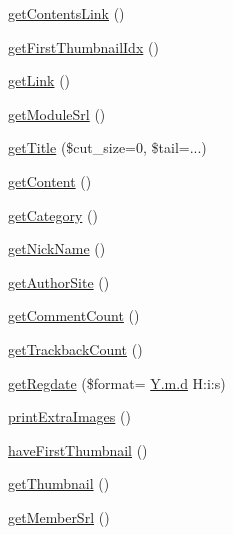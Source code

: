 \begin{DoxyCompactItemize}
\item 
\hyperlink{classmcontentItem_a60fe1f5cbd47314c2910a8782a3252a9}{get\+Contents\+Link} ()
\item 
\hyperlink{classmcontentItem_acb7e5ab4fbeac716585618eba64960aa}{get\+First\+Thumbnail\+Idx} ()
\item 
\hyperlink{classmcontentItem_a5a2cad58644aabb016942e427998f32c}{get\+Link} ()
\item 
\hyperlink{classmcontentItem_a9b9841e39ff3ee331679270f9e075203}{get\+Module\+Srl} ()
\item 
\hyperlink{classmcontentItem_a180633138fb77537e7da900074aa7454}{get\+Title} (\$cut\+\_\+size=0, \$tail=\textquotesingle{}...\textquotesingle{})
\item 
\hyperlink{classmcontentItem_a19b333e6ff14db6f7f77c3f94471bdff}{get\+Content} ()
\item 
\hyperlink{classmcontentItem_ae8d1d6e76cc1cfa79d544d47acaedbcc}{get\+Category} ()
\item 
\hyperlink{classmcontentItem_a8182db3f99934760d5f52082b233a1cb}{get\+Nick\+Name} ()
\item 
\hyperlink{classmcontentItem_a90fc323e4d3cf2661e6af5e51babd05f}{get\+Author\+Site} ()
\item 
\hyperlink{classmcontentItem_ac60221ec5be0a8158c5248c09efd8fb1}{get\+Comment\+Count} ()
\item 
\hyperlink{classmcontentItem_afb955c421fa34f36c51edd795d3a00c7}{get\+Trackback\+Count} ()
\item 
\hyperlink{classmcontentItem_a9f7a6c2fc454c1d7e7524504141f3fc1}{get\+Regdate} (\$format= \textquotesingle{}\hyperlink{xpresseditor_8min_8js_aa27188e30a5d2270a230edf44af69623}{Y.\+m.\+d} H\+:i\+:s\textquotesingle{})
\item 
\hyperlink{classmcontentItem_a0cd7ac4bbaf7e7561f5597920c691f9d}{print\+Extra\+Images} ()
\item 
\hyperlink{classmcontentItem_ac8b5fb3d84cdc8a96a8c02e9472e25dd}{have\+First\+Thumbnail} ()
\item 
\hyperlink{classmcontentItem_a25e5c63dceabc33afe0b5ce5b3ddafcf}{get\+Thumbnail} ()
\item 
\hyperlink{classmcontentItem_ab7ad6741a93ab7d631f78bf1253f6800}{get\+Member\+Srl} ()
\end{DoxyCompactItemize}
